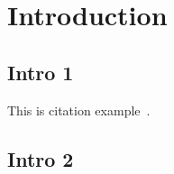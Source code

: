 %

\section{Introduction}\label{sec:2_1}
\subsection{Intro 1}\label{subsec:2_1_1}
This is citation example~\cite{Einstein1905SR}.
\lipsum[10]

\subsection{Intro 2}\label{subsec:2_1_2}

\lipsum[10]
